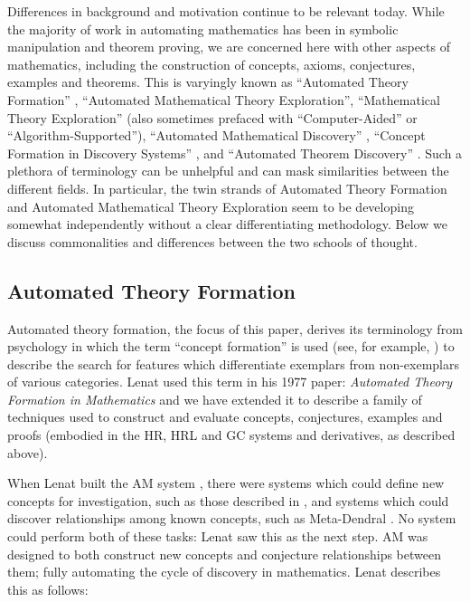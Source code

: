 Differences in background and motivation continue to be relevant
today. While the majority of work in automating mathematics has been
in symbolic manipulation and theorem proving, we are concerned here
with other aspects of mathematics, including the construction of
concepts, axioms, conjectures, examples and theorems. This is
varyingly known as ``Automated Theory Formation''
\cite{lenat:77,colton:book}, ``Automated Mathematical Theory
Exploration'', ``Mathematical Theory Exploration''
\cite{buchberger:06} (also sometimes prefaced with ``Computer-Aided''
or ``Algorithm-Supported''), ``Automated Mathematical Discovery''
\cite{epstein:91,colton:interestingness,esarm2008}, ``Concept
Formation in Discovery Systems'' \cite{haase}, and ``Automated Theorem
Discovery'' \cite{roy}. Such a plethora of terminology can be
unhelpful and can mask similarities between the different fields. In
particular, the twin strands of Automated Theory Formation and
Automated Mathematical Theory Exploration seem to be developing
somewhat independently without a clear differentiating
methodology. Below we discuss commonalities and differences between
the two schools of thought.



\subsection{Automated Theory Formation}

Automated theory formation, the focus of this paper, derives its
terminology from psychology in which the term ``concept formation'' is
used (see, for example, \cite{bruner:67}) to describe the search for
features which differentiate exemplars from non-exemplars of various
categories. Lenat used this term in his 1977 paper: {\em Automated
  Theory Formation in Mathematics} \cite{lenat:77} and we have
extended it to describe a family of techniques used to construct and
evaluate concepts, conjectures, examples and proofs (embodied in the
HR, HRL and GC systems and derivatives, as described above).

When Lenat built the AM system \cite{lenat:77}, there were systems
which could define new concepts for investigation, such as those
described in \cite{winston}, and systems which could discover
relationships among known concepts, such as Meta-Dendral
\cite{buchanan:75}. No system could perform both of these tasks: Lenat
saw this as the next step. AM was designed to both construct new
concepts and conjecture relationships between them; fully automating
the cycle of discovery in mathematics. Lenat describes this as
follows:

